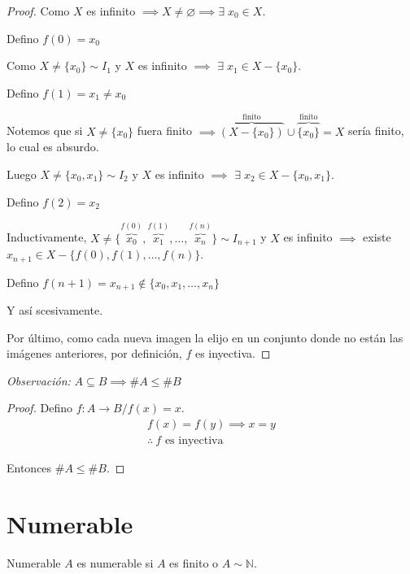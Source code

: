 \begin{proof}\phantom{.}

    Como $X$ es infinito $\implies X \neq \varnothing \implies \exists \;
    x_0 \in X$.

    Defino $f(0) = x_0$

    \medskip
    Como $X \neq \{x_0\} \sim I_1$ y $X$ es infinito $\implies$ 
    $\exists \; x_1 \in X - \{ x_0 \}$. 

    Defino $f(1) = x_1 \neq x_0$

    Notemos que si
    $X \neq \{ x_0 \}$ fuera finito 
    $\implies \overbrace{(X-\{x_0\})}^{\text{finito}}
    \cup \overbrace{\{ x_0 \}}^{\text{finito}} = X $ sería finito, lo cual
    es absurdo.

    \medskip

    Luego $X \neq \{x_0, x_1\} \sim I_2$ y $X$ es infinito $\implies$ 
    $\exists \; x_2 \in X - \{x_0, x_1\}$. 

    Defino $f(2) = x_2$

    Inductivamente,
    $X \neq \{\overbrace{x_0}^{f(0)}, \overbrace{x_1}^{f(1)}, \dotsc, 
    \overbrace{x_n}^{f(n)}\} 
    \sim I_{n+1}$ y $X$ es infinito $\implies$ existe 
    $x_{n+1} \in X - \{f(0), f(1), \dotsc, f(n)\}$. 

    Defino 
    $f(n+1) = x_{n+1} \notin \{ x_0, x_1, \dotsc, x_n \}$


    Y así scesivamente.


    Por último, como cada nueva imagen la elijo en un conjunto donde no están 
    las imágenes anteriores, por definición, $f$ es inyectiva.

\end{proof}


\bigskip
\textit{Observación:}
$A \subseteq B \implies \# A \leq \# B$


\begin{proof} \phantom{.}

    Defino $f: A \to B / f(x) = x$.
    \begin{gather*}
        f(x) = f(y) \implies x = y \\
        \therefore ~ f \text{ es inyectiva}
    \end{gather*}

    Entonces $\# A \leq \# B$.

\end{proof}

\section{Numerable}
\begin{definicion}{Numerable}{}
    $A$ es numerable si $A$ es finito o $A \sim \mathbb{N}$.
\end{definicion}

